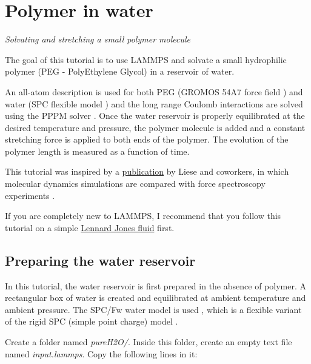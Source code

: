 \chapter{Polymer in water}
\label{all-atoms-label}

\noindent \vspace{-1cm} \noindent \textcolor{graytitle}{\textit{{\Large Solvating and stretching a small polymer molecule}}\vspace{0.5cm} }

\vspace{0.25cm} \noindent The goal of this tutorial is to use LAMMPS and solvate a small
hydrophilic polymer (PEG - PolyEthylene Glycol) in a reservoir of water. 

\vspace{0.25cm} \noindent An all-atom description is used for both PEG (GROMOS 54A7 force
field \cite{schmid2011definition}) and water
(SPC flexible model \cite{wu2006flexible}) and the long
range Coulomb interactions are solved using the PPPM solver \cite{luty1996calculating}.    
Once the water reservoir is properly
equilibrated at the desired temperature and pressure, the polymer molecule
is added and a constant stretching force is applied to both
ends of the polymer. The evolution of the polymer length
is measured as a function of time.

\vspace{0.25cm} \noindent This tutorial was inspired by a \href{https://doi.org/10.1021/acsnano.6b07071}{publication} by Liese and coworkers, in which
molecular dynamics simulations are
compared with force spectroscopy experiments \cite{liese2017hydration}.

\vspace{0.25cm} \noindent If you are completely new to LAMMPS, I recommend that
you follow this tutorial on a simple \hyperref[lennard-jones-label]{Lennard Jones fluid} first.

\section{Preparing the water reservoir}
\noindent In this tutorial, the water reservoir is first prepared in the absence of
polymer. A rectangular box of water is created and
equilibrated at ambient temperature and ambient pressure.
The SPC/Fw water model is used \cite{wu2006flexible}, which is
a flexible variant of the rigid SPC (simple point charge)
model \cite{berendsen1981interaction}.

\vspace{0.25cm} \noindent Create a folder named \textit{pureH2O/}. Inside this folder, create
an empty text file named \textit{input.lammps}. Copy the following
lines in it:

